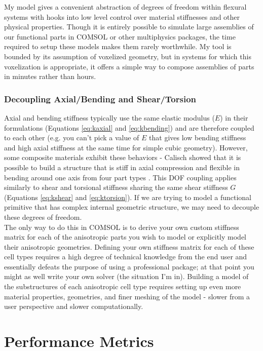 {My model gives a convenient abstraction of degrees of freedom within flexural systems with hooks into low level control over material stiffnesses and other physical properties.  Though it is entirely possible to simulate large assemblies of our functional parts in COMSOL or other multiphysics packages, the time required to setup these models makes them rarely worthwhile.  My tool is bounded by its assumption of voxelized geometry, but in systems for which this voxelization is appropriate, it offers a simple way to compose assemblies of parts in minutes rather than hours.  

\subsubsection{Decoupling Axial/Bending and Shear/Torsion}\label{sec:decoupling}

Axial and bending stiffness typically use the same elastic modulus ($E$) in their formulations (Equations \ref{eq:kaxial} and \ref{eq:kbending}) and are therefore coupled to each other (e.g. you can't pick a value of $E$ that gives low bending stiffness and high axial stiffness at the same time for simple cubic geometry).  However, some composite materials exhibit these behaviors - Calisch showed that it is possible to build a structure that is stiff in axial compression and flexible in bending around one axis from four part types \cite{Calisch2014}.  This DOF coupling applies similarly to shear and torsional stiffness sharing the same shear stiffness $G$ (Equations \ref{eq:kshear} and \ref{eq:ktorsion}).  If we are trying to model a functional primitive that has complex internal geometric structure, we may need to decouple these degrees of freedom.\\

The only way to do this in COMSOL is to derive your own custom stiffness matrix for each of the anisotropic parts you wish to model or explicitly model their anisotropic geometries.  Defining your own stiffness matrix for each of these cell types requires a high degree of technical knowledge from the end user and essentially defeats the purpose of using a professional package; at that point you might as well write your own solver (the situation I'm in).  Building a model of the substructures of each anisotropic cell type requires setting up even more material properties, geometries, and finer meshing of the model - slower from a user perspective and slower computationally.

\section{Performance Metrics}\label{sec:performance}

}
